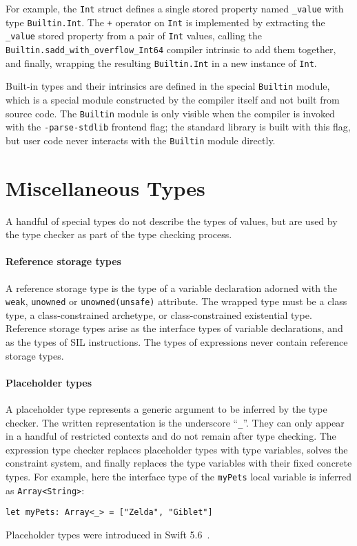 \documentclass[a4paper,headsepline,bibliography=totoc,toc=flat,fleqn,twoside=semi]{scrbook}
\theoremstyle{definition}
\theoremstyle{definition}
\theoremstyle{definition}
\begin{document}
For example, the \texttt{Int} struct defines a single stored property named \texttt{\_value} with type \texttt{Builtin.Int}. The \texttt{+} operator on \texttt{Int} is implemented by extracting the \texttt{\_value} stored property from a pair of \texttt{Int} values, calling the \texttt{Builtin.sadd\_with\_overflow\_Int64} compiler intrinsic to add them together, and finally, wrapping the resulting \texttt{Builtin.Int} in a new instance of \texttt{Int}.

Built-in types and their intrinsics are defined in the special \texttt{Builtin} module, which is a special module constructed by the compiler itself and not built from source code. The \texttt{Builtin} module is only visible when the compiler is invoked with the \texttt{-parse-stdlib} frontend flag; the standard library is built with this flag, but user code never interacts with the \texttt{Builtin} module directly.

\section{Miscellaneous Types}

A handful of special types do not describe the types of values, but are used by the type checker as part of the type checking process.

\paragraph{Reference storage types}
A reference storage type is the type of a variable declaration adorned with the \texttt{weak}, \texttt{unowned} or \texttt{unowned(unsafe)} attribute. The wrapped type must be a class type, a class-constrained archetype, or class-constrained existential type. Reference storage types arise as the interface types of variable declarations, and as the types of SIL instructions. The types of expressions never contain reference storage types.

\paragraph{Placeholder types}
A placeholder type represents a generic argument to be inferred by the type checker. The written representation is the underscore ``\texttt{\_}''. They can only appear in a handful of restricted contexts and do not remain after type checking. The expression type checker replaces placeholder types with type variables, solves the constraint system, and finally replaces the type variables with their fixed concrete types. For example, here the interface type of the \texttt{myPets} local variable is inferred as \texttt{Array<String>}:
\begin{Verbatim}
let myPets: Array<_> = ["Zelda", "Giblet"]
\end{Verbatim}
Placeholder types were introduced in Swift 5.6~\cite{se0315}.
\end{document}
